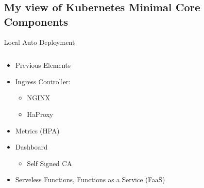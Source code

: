 \subsection{My view of Kubernetes Minimal Core Components}

\begin{frame}{Local Auto Deployment}
	\begin{columns}[T] %
		\begin{column}{5cm} %
			\begin{itemize}
				\item<+-| alert@+> Previous Elements
				\item<+-| alert@+> Ingress Controller:
					\begin{itemize}
						\item<+-| alert@+> NGINX
						\item<+-| alert@+> HaProxy
					\end{itemize}
				\item<+-| alert@+> Metrics (HPA)
				\item<+-| alert@+> Dashboard
					\begin{itemize}
						\item<+-| alert@+> Self Signed CA
					\end{itemize}
				\item<+-| alert@+> Serveless Functions, Functions as a Service (FaaS)
			\end{itemize}
		\end{column}
		\begin{column}{5cm} %
		\end{column}
	\end{columns}
\end{frame}